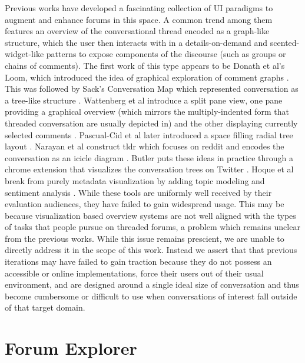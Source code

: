 \documentclass{egpubl}
\begin{document}
Previous works have developed a fascinating collection of UI paradigms to augment and enhance forums in this space. 
%
A common trend among them features an overview of the conversational thread encoded as a graph-like structure, which the user then interacts with in a details-on-demand \cite{shneiderman1996eyes} and scented-widget-like \cite{willett2007scented} patterns to expose components of the discourse (such as groups or chains of comments). 
%
 The first work of this type appears to be Donath et al's Loom, which introduced the idea of graphical exploration of comment graphs \cite{donath1999visualizing}. 
 This was followed by Sack's Conversation Map which represented conversation as a tree-like structure \cite{sack2000conversation}. 
 Wattenberg et al introduce a split pane view, one pane providing a graphical overview (which mirrors the multiply-indented form that threaded conversation are usually depicted in) and the other displaying currently selected comments \cite{wattenberg2003conversation, dave2004flash}.
% 
Pascual-Cid et al later introduced a space filling radial tree layout \cite{pascual2009exploring}. 
%
Narayan et al construct tldr which focuses on reddit and encodes the conversation as an icicle diagram \cite{narayan2010not}. 
%
Butler puts these ideas in practice through a chrome extension that visualizes the conversation trees on Twitter \cite{treeverse}.
%
Hoque et al break from purely metadata visualization by adding topic modeling and sentiment analysis  \cite{hoque2014convis, hoque2016interactive}.
%
While these tools are uniformly well received by their evaluation audiences, they have failed to gain widespread usage.
%
This may be because visualization based overview systems are not well aligned with the types of tasks that people pursue on threaded forums, a problem which remains unclear from the previous works.
%
While this issue remains prescient, we are unable to directly address it in the scope of this work.
%
Instead we assert that that previous iterations may have failed to gain traction because they do not possess an accessible or online implementations, force their users out of their usual environment, and are designed around a single ideal size of conversation and thus become cumbersome or difficult to use when conversations of interest fall outside of that target domain.






\section{Forum Explorer}
\end{document}
